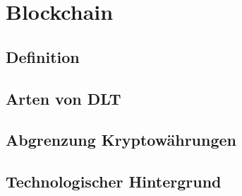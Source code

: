 \section{Blockchain}

\subsection{Definition}

\subsection{Arten von DLT}

\subsection{Abgrenzung Kryptowährungen}

\subsection{Technologischer Hintergrund}


\newpage